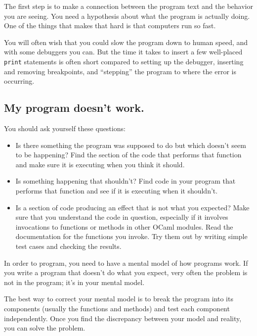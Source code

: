 \documentclass[10pt]{book}
\begin{document}
{The first step is to make a connection between the program
text and the behavior you are seeing.  You need a hypothesis
about what the program is actually doing.  One of the things
that makes that hard is that computers run so fast.

You will often wish that you could slow the program down to human
speed, and with some debuggers you can.  But the time it takes to
insert a few well-placed {\tt print} statements is often short compared to
setting up the debugger, inserting and removing breakpoints, and
``stepping'' the program to where the error is occurring.

\subsection{My program doesn't work.}

You should ask yourself these questions:

\begin{itemize}

\item Is there something the program was supposed to do but
which doesn't seem to be happening?  Find the section of the code
that performs that function and make sure it is executing when
you think it should.

\item Is something happening that shouldn't?  Find code in
your program that performs that function and see if it is
executing when it shouldn't.

\item Is a section of code producing an effect that is not
what you expected?  Make sure that you understand the code in
question, especially if it involves invocations to functions or methods in
other OCaml modules.  Read the documentation for the functions you invoke.
Try them out by writing simple test cases and checking the results.

\end{itemize}

In order to program, you need to have a mental model of how
programs work.  If you write a program that doesn't do what you expect,
very often the problem is not in the program; it's in your mental
model.


The best way to correct your mental model is to break the program
into its components (usually the functions and methods) and test
each component independently.  Once you find the discrepancy
between your model and reality, you can solve the problem.

}
\end{document}
